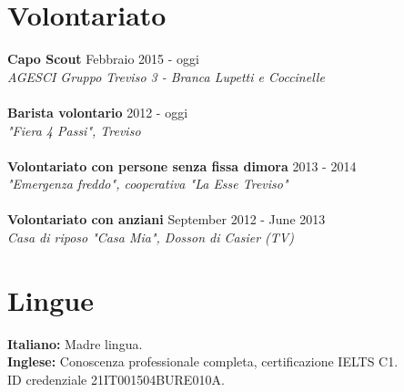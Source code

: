 \documentclass[margin, 10pt]{res}
\begin{document}
\begin{resume}
\section{Volontariato}

\textbf{Capo Scout} \hfill Febbraio 2015 - oggi \\
\textit{AGESCI Gruppo Treviso 3 - Branca Lupetti e Coccinelle} \\ \\
\textbf{Barista volontario} \hfill 2012 - oggi \\
\textit{"Fiera 4 Passi", Treviso} \\ \\
\textbf{Volontariato con persone senza fissa dimora} \hfill 2013 - 2014 \\
\textit{"Emergenza freddo", cooperativa "La Esse Treviso"} \\ \\
\textbf{Volontariato con anziani} \hfill September 2012 - June 2013 \\
\textit{Casa di riposo "Casa Mia", Dosson di Casier (TV)} 





\section{Lingue}
\textbf{Italiano: } Madre lingua. \\
\textbf{Inglese: } Conoscenza professionale completa, certificazione IELTS C1.\\ID credenziale 21IT001504BURE010A.\\

\end{resume}
\end{document}
